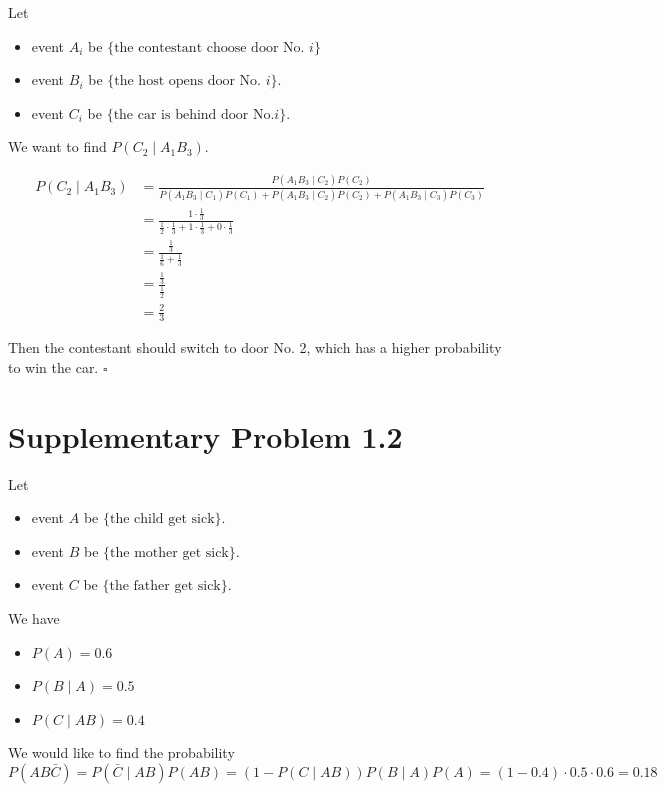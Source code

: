 \documentclass[a4paper, UTF-8]{article}
\theoremstyle{plain}
\begin{document}
Let

\begin{itemize}
  \item event $A_i$ be $\{\text{the contestant choose door No. } i\}$
  \item event $B_i$ be $\{\text{the host opens door No. } i\}$.
  \item event $C_i$ be $\{\text{the car is behind door No.} i\}$.
\end{itemize}

We want to find $P(C_2\mid A_1B_3)$.

\begin{align*} 
P(C_2\mid A_1B_3) &= \frac{P(A_1B_3\mid C_2)P(C_2)}{P(A_1B_3\mid C_1)P(C_1) + P(A_1B_3\mid C_2)P(C_2) + P(A_1B_3\mid C_3)P(C_3)} \\
&= \frac{1 \cdot \frac{1}{3}}{\frac{1}{2} \cdot \frac{1}{3} + 1 \cdot \frac{1}{3} + 0 \cdot \frac{1}{3}} \\
&= \frac{\frac{1}{3}}{\frac{1}{6} + \frac{1}{3}} \\
&= \frac{\frac{1}{3}}{\frac{1}{2}} \\
&= \frac{2}{3}
\end{align*}

Then the contestant should switch to door No. 2, which has a higher probability to win the car. $\square$

\section{Supplementary Problem 1.2}

Let 
\begin{itemize}
  \item event $A$ be $\{\text{the child get sick}\}$.
  \item event $B$ be $\{\text{the mother get sick}\}$.
  \item event $C$ be $\{\text{the father get sick}\}$.
\end{itemize}

We have 

\begin{itemize}
  \item $P(A) = 0.6$
  \item $P(B \mid A) = 0.5$
  \item $P(C \mid AB) = 0.4$
\end{itemize}

We would like to find the probability 
$$
P(AB\bar{C}) = P(\bar{C}\mid AB)P(AB) = (1 - P(C\mid AB))P(B\mid A)P(A) = (1 - 0.4) \cdot 0.5 \cdot 0.6 = 0.18
$$
\end{document}
